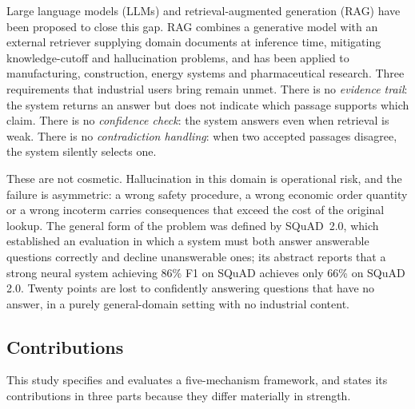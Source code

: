 \documentclass[preprint,3p,times]{elsarticle}
\begin{document}
Large language models (LLMs) and retrieval-augmented generation (RAG) have
been proposed to close this gap. RAG combines a generative model with an
external retriever supplying domain documents at inference time, mitigating
knowledge-cutoff and hallucination problems, and has been applied to
manufacturing, construction, energy systems and pharmaceutical research.
Three requirements that industrial users bring remain unmet. There is no
\emph{evidence trail}: the system returns an answer but does not indicate which
passage supports which claim. There is no \emph{confidence check}: the system
answers even when retrieval is weak. There is no \emph{contradiction
handling}: when two accepted passages disagree, the system silently selects
one.

These are not cosmetic. Hallucination in this domain is operational risk, and
the failure is asymmetric: a wrong safety procedure, a wrong economic order
quantity or a wrong incoterm carries consequences that exceed the cost of the
original lookup. The general form of the problem was defined by SQuAD~2.0,
which established an evaluation in which a system must both answer answerable
questions correctly and decline unanswerable ones; its abstract reports that a
strong neural system achieving 86\% F1 on SQuAD achieves only 66\% on SQuAD
2.0. Twenty points are lost to confidently answering questions that have no
answer, in a purely general-domain setting with no industrial content.

\subsection{Contributions}

This study specifies and evaluates a five-mechanism framework, and states its
contributions in three parts because they differ materially in strength.
\end{document}
